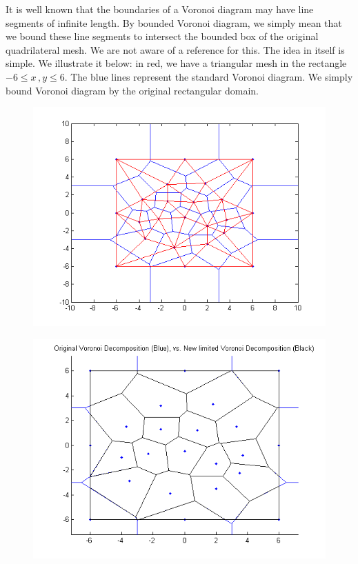 \documentclass{article}
\begin{document}
It is well known that the boundaries of a Voronoi diagram may have line segments of infinite length. By bounded Voronoi diagram, 
we simply mean that we bound these line segments to intersect the  bounded box of the original quadrilateral mesh. 
We are not aware of a reference for this. The idea in itself is simple. We illustrate it below: in red, we have a triangular mesh 
in the rectangle $-6 \le x\,,y \le 6$. The blue lines represent the standard Voronoi diagram. We simply bound Voronoi diagram by 
the original rectangular domain.

\begin{figure}[H]
\centering
\includegraphics[scale=0.75]{bounded_voronoi_example.png}
\end{figure}
\begin{figure}[H]
\centering
\includegraphics[scale=0.75]{bounded_voronoi_example2.png}
\end{figure}
\end{document}
